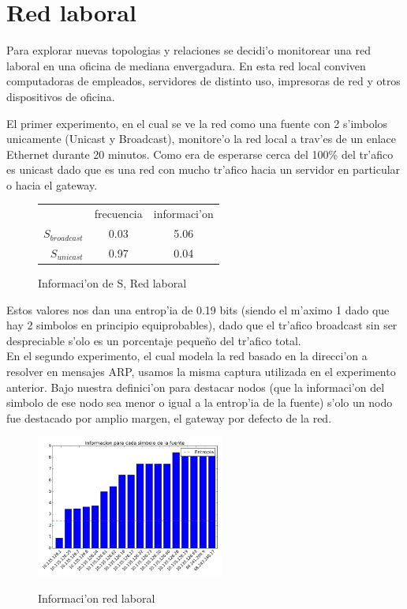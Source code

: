 \section{Red laboral}
Para explorar nuevas topologias y relaciones se decidi'o monitorear una red laboral en una oficina de mediana envergadura. En esta
red local conviven computadoras de empleados, servidores de distinto uso, impresoras de red y otros dispositivos de oficina. 

El primer experimento, en el cual se ve la red como una fuente con 2 s'imbolos unicamente (Unicast y Broadcast), monitore'o la red local 
a trav'es de un enlace
Ethernet durante 20 minutos. Como era de esperarse cerca del 100\% del tr'afico es unicast dado que es una red con mucho tr'afico
hacia un servidor en particular o hacia el gateway.

\begin{figure}[!h]
\centering
\caption{Informaci'on de S, Red laboral}
\begin{tabular}{ r|c|c| }
\multicolumn{1}{r}{}
 &  \multicolumn{1}{c}{frecuencia}
 & \multicolumn{1}{c}{informaci'on} \\
\cline{2-3}
$S_{broadcast}$ & 0.03 & 5.06 \\
\cline{2-3}
$S_{unicast}$ & 0.97 & 0.04 \\
\cline{2-3}
\end{tabular}
\end{figure}
 
 Estos valores nos dan una entrop'ia de 0.19 bits (siendo el m'aximo 1 dado que hay 2 simbolos en principio equiprobables),
 dado que el tr'afico broadcast sin ser despreciable s'olo es un porcentaje peque\~no del tr'afico total.\\
 
En el segundo experimento, el cual modela la red basado en la direcci'on a resolver en mensajes ARP, usamos la misma captura
utilizada en el experimento anterior. Bajo nuestra definici'on para destacar nodos (que la informaci'on del simbolo de ese nodo 
sea menor o igual a la entrop'ia de la fuente) s'olo un nodo fue destacado por amplio margen, el gateway por defecto de la red.\\

\begin{figure}[!h]
\centering
\caption{Informaci'on red laboral}
\includegraphics[width=0.55\textwidth]{red2_info}
 \label{fig:red2info}
\end{figure}

